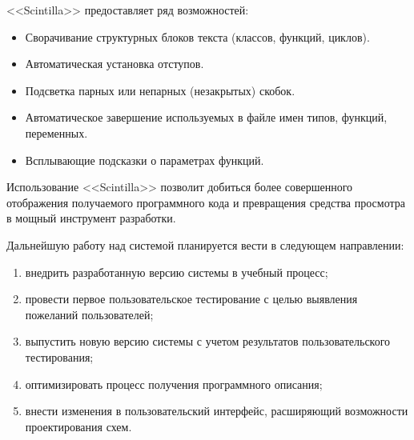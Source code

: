 <<Scintilla>> предоставляет ряд возможностей:
\begin{itemize}
  \item Сворачивание структурных блоков текста (классов, функций, циклов).
  \item Автоматическая установка отступов.
  \item Подсветка парных или непарных (незакрытых) скобок.
  \item Автоматическое завершение используемых в файле имен типов, функций, переменных.
  \item Всплывающие подсказки о параметрах функций.
\end{itemize}

Использование <<Scintilla>> позволит добиться более совершенного отображения получаемого программного кода и превращения средства просмотра в мощный инструмент разработки.

Дальнейшую работу над системой планируется вести в следующем направлении:
\begin{enumerate}
  \item внедрить разработанную версию системы в учебный процесс;
  \item провести первое пользовательское тестирование с целью выявления пожеланий пользователей;
  \item выпустить новую версию системы с учетом результатов пользовательского тестирования;
  \item оптимизировать процесс получения программного описания;
  \item внести изменения в пользовательский интерфейс, расширяющий возможности проектирования схем.
\end{enumerate}